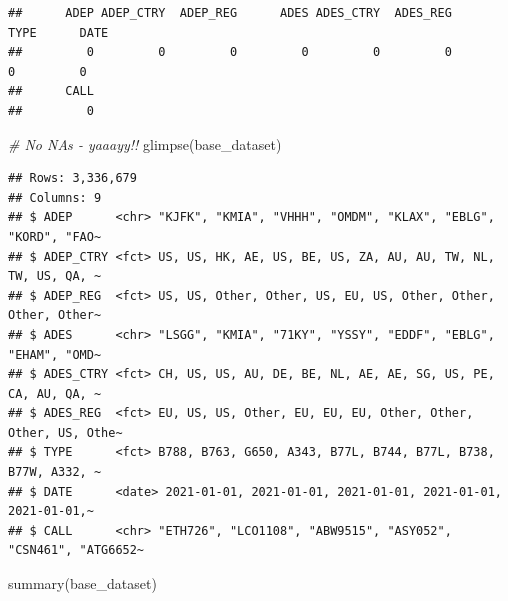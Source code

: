 \documentclass[conference,final,]{IEEEtran}
\newenvironment{Shaded}{\begin{snugshade}}{\end{snugshade}}
\newcommand{\CommentTok}[1]{\textcolor[rgb]{0.56,0.35,0.01}{\textit{#1}}}
\newcommand{\FunctionTok}[1]{\textcolor[rgb]{0.00,0.00,0.00}{#1}}
\newcommand{\NormalTok}[1]{#1}
\begin{document}
\begin{verbatim}
##      ADEP ADEP_CTRY  ADEP_REG      ADES ADES_CTRY  ADES_REG      TYPE      DATE 
##         0         0         0         0         0         0         0         0 
##      CALL 
##         0
\end{verbatim}

\begin{Shaded}
\begin{Highlighting}[]
\CommentTok{\# No NA\textquotesingle{}s {-} yaaayy!!}
\FunctionTok{glimpse}\NormalTok{(base\_dataset)}
\end{Highlighting}
\end{Shaded}

\begin{verbatim}
## Rows: 3,336,679
## Columns: 9
## $ ADEP      <chr> "KJFK", "KMIA", "VHHH", "OMDM", "KLAX", "EBLG", "KORD", "FAO~
## $ ADEP_CTRY <fct> US, US, HK, AE, US, BE, US, ZA, AU, AU, TW, NL, TW, US, QA, ~
## $ ADEP_REG  <fct> US, US, Other, Other, US, EU, US, Other, Other, Other, Other~
## $ ADES      <chr> "LSGG", "KMIA", "71KY", "YSSY", "EDDF", "EBLG", "EHAM", "OMD~
## $ ADES_CTRY <fct> CH, US, US, AU, DE, BE, NL, AE, AE, SG, US, PE, CA, AU, QA, ~
## $ ADES_REG  <fct> EU, US, US, Other, EU, EU, EU, Other, Other, Other, US, Othe~
## $ TYPE      <fct> B788, B763, G650, A343, B77L, B744, B77L, B738, B77W, A332, ~
## $ DATE      <date> 2021-01-01, 2021-01-01, 2021-01-01, 2021-01-01, 2021-01-01,~
## $ CALL      <chr> "ETH726", "LCO1108", "ABW9515", "ASY052", "CSN461", "ATG6652~
\end{verbatim}

\begin{Shaded}
\begin{Highlighting}[]
\FunctionTok{summary}\NormalTok{(base\_dataset)}
\end{Highlighting}
\end{Shaded}
\end{document}
